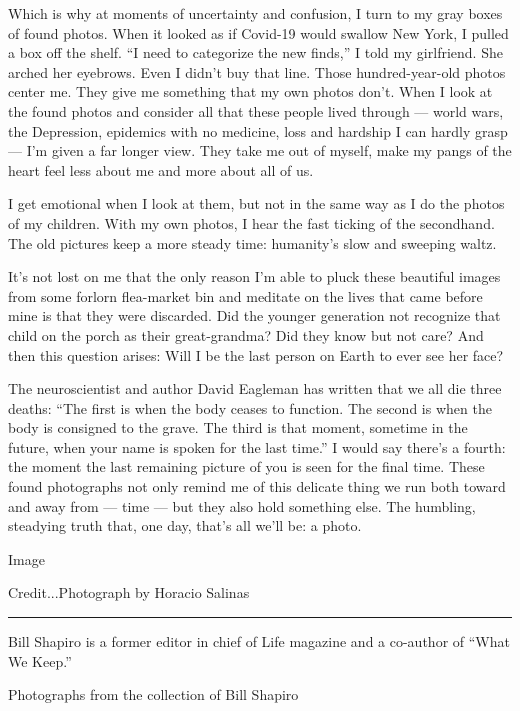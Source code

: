 Which is why at moments of uncertainty and confusion, I turn to my gray
boxes of found photos. When it looked as if Covid-19 would swallow New
York, I pulled a box off the shelf. ``I need to categorize the new
finds,'' I told my girlfriend. She arched her eyebrows. Even I didn't
buy that line. Those hundred-year-old photos center me. They give me
something that my own photos don't. When I look at the found photos and
consider all that these people lived through --- world wars, the
Depression, epidemics with no medicine, loss and hardship I can hardly
grasp --- I'm given a far longer view. They take me out of myself, make
my pangs of the heart feel less about me and more about all of us.

I get emotional when I look at them, but not in the same way as I do the
photos of my children. With my own photos, I hear the fast ticking of
the secondhand. The old pictures keep a more steady time: humanity's
slow and sweeping waltz.

It's not lost on me that the only reason I'm able to pluck these
beautiful images from some forlorn flea-market bin and meditate on the
lives that came before mine is that they were discarded. Did the younger
generation not recognize that child on the porch as their great-grandma?
Did they know but not care? And then this question arises: Will I be the
last person on Earth to ever see her face?

The neuroscientist and author David Eagleman has written that we all die
three deaths: ``The first is when the body ceases to function. The
second is when the body is consigned to the grave. The third is that
moment, sometime in the future, when your name is spoken for the last
time.'' I would say there's a fourth: the moment the last remaining
picture of you is seen for the final time. These found photographs not
only remind me of this delicate thing we run both toward and away from
--- time --- but they also hold something else. The humbling, steadying
truth that, one day, that's all we'll be: a photo.

Image

Credit...Photograph by Horacio Salinas

\begin{center}\rule{0.5\linewidth}{\linethickness}\end{center}

Bill Shapiro is a former editor in chief of Life magazine and a
co-author of ``What We Keep.''

Photographs from the collection of Bill Shapiro

